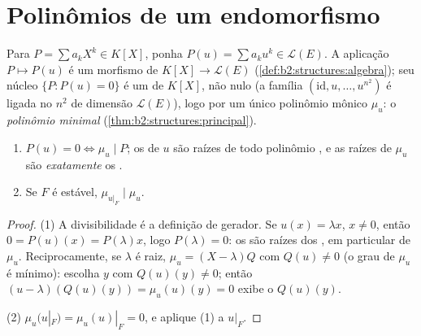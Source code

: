 \section{Polinômios de um endomorfismo}

\begin{definition}\label{def:b2:reduction:polyu}
Para $P = \sum a_k X^k \in K[X]$, ponha $P(u) = \sum a_k u^k \in
\mathcal{L}(E)$. A aplicação $P \mapsto P(u)$ é um morfismo de 
$K[X] \to \mathcal{L}(E)$ (\cref{def:b2:structures:algebra});
seu núcleo $\{P : P(u) = 0\}$ é um  de $K[X]$, não nulo (a
família $(\mathrm{id}, u, \dots, u^{n^2})$ é ligada no
$n^2$ de dimensão $\mathcal{L}(E)$), logo  por um único
polinômio mônico $\mu_u$: o \emph{polinômio
minimal}
(\cref{thm:b2:structures:principal}).
\end{definition}

\begin{proposition}\label{prop:b2:reduction:minpoly}
\begin{enumerate}
  \item $P(u) = 0 \iff \mu_u \mid P$; os  de $u$ são raízes
        de todo polinômio , e as raízes de $\mu_u$
        são \emph{exatamente} os .
  \item Se $F$ é estável, $\mu_{u|_F} \mid \mu_u$.
\end{enumerate}
\end{proposition}

\begin{proof}
(1) A divisibilidade é a definição de gerador. Se $u(x) =
\lambda x$, $x \neq 0$, então $0 = P(u)(x) = P(\lambda)x$, logo
$P(\lambda) = 0$: os  são raízes dos , em
particular de $\mu_u$. Reciprocamente, se $\lambda$ é raiz, $\mu_u =
(X - \lambda)Q$ com $Q(u) \neq 0$ (o grau de $\mu_u$ é mínimo): escolha
$y$ com $Q(u)(y) \neq 0$; então $(u - \lambda)(Q(u)(y)) = \mu_u(u)(y)
= 0$ exibe o  $Q(u)(y)$.

(2) $\mu_u(u|_F) = \mu_u(u)|_F = 0$, e aplique (1) a $u|_F$.
\end{proof}

